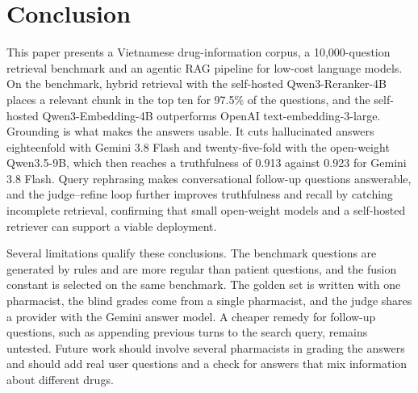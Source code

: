 \section{Conclusion}\label{sec:conclusion}

This paper presents a Vietnamese drug-information corpus, a 10{,}000-question retrieval benchmark and an agentic RAG pipeline for low-cost language models. On the benchmark, hybrid retrieval with the self-hosted Qwen3-Reranker-4B places a relevant chunk in the top ten for 97.5\% of the questions, and the self-hosted Qwen3-Embedding-4B outperforms OpenAI text-embedding-3-large. Grounding is what makes the answers usable. It cuts hallucinated answers eighteenfold with Gemini 3.8 Flash and twenty-five-fold with the open-weight Qwen3.5-9B, which then reaches a truthfulness of 0.913 against 0.923 for Gemini 3.8 Flash. Query rephrasing makes conversational follow-up questions answerable, and the judge--refine loop further improves truthfulness and recall by catching incomplete retrieval, confirming that small open-weight models and a self-hosted retriever can support a viable deployment.

Several limitations qualify these conclusions. The benchmark questions are generated by rules and are more regular than patient questions, and the fusion constant is selected on the same benchmark. The golden set is written with one pharmacist, the blind grades come from a single pharmacist, and the judge shares a provider with the Gemini answer model. A cheaper remedy for follow-up questions, such as appending previous turns to the search query, remains untested. Future work should involve several pharmacists in grading the answers and should add real user questions and a check for answers that mix information about different drugs.
